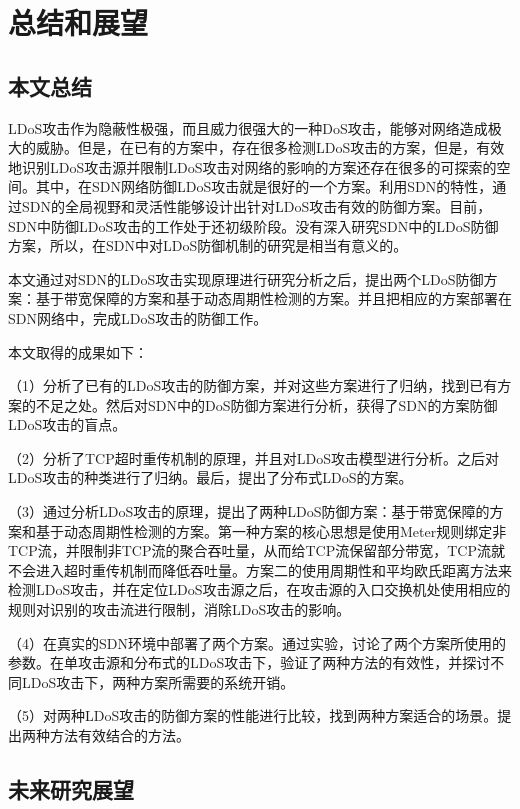 \chapter{总结和展望}
\label{cha:conclusion}

\section{本文总结}
\label{chap6:conclusion}

LDoS攻击作为隐蔽性极强，而且威力很强大的一种DoS攻击，能够对网络造成极大的威胁。但是，在已有的方案中，存在很多检测LDoS攻击的方案，但是，有效地识别LDoS攻击源并限制LDoS攻击对网络的影响的方案还存在很多的可探索的空间。其中，在SDN网络防御LDoS攻击就是很好的一个方案。利用SDN的特性，通过SDN的全局视野和灵活性能够设计出针对LDoS攻击有效的防御方案。目前，SDN中防御LDoS攻击的工作处于还初级阶段。没有深入研究SDN中的LDoS防御方案，所以，在SDN中对LDoS防御机制的研究是相当有意义的。

本文通过对SDN的LDoS攻击实现原理进行研究分析之后，提出两个LDoS防御方案：基于带宽保障的方案和基于动态周期性检测的方案。并且把相应的方案部署在SDN网络中，完成LDoS攻击的防御工作。

\noindent 本文取得的成果如下：

（1）分析了已有的LDoS攻击的防御方案，并对这些方案进行了归纳，找到已有方案的不足之处。然后对SDN中的DoS防御方案进行分析，获得了SDN的方案防御LDoS攻击的盲点。

（2）分析了TCP超时重传机制的原理，并且对LDoS攻击模型进行分析。之后对LDoS攻击的种类进行了归纳。最后，提出了分布式LDoS的方案。

（3）通过分析LDoS攻击的原理，提出了两种LDoS防御方案：基于带宽保障的方案和基于动态周期性检测的方案。第一种方案的核心思想是使用Meter规则绑定非TCP流，并限制非TCP流的聚合吞吐量，从而给TCP流保留部分带宽，TCP流就不会进入超时重传机制而降低吞吐量。方案二的使用周期性和平均欧氏距离方法来检测LDoS攻击，并在定位LDoS攻击源之后，在攻击源的入口交换机处使用相应的规则对识别的攻击流进行限制，消除LDoS攻击的影响。

（4）在真实的SDN环境中部署了两个方案。通过实验，讨论了两个方案所使用的参数。在单攻击源和分布式的LDoS攻击下，验证了两种方法的有效性，并探讨不同LDoS攻击下，两种方案所需要的系统开销。

（5）对两种LDoS攻击的防御方案的性能进行比较，找到两种方案适合的场景。提出两种方法有效结合的方法。


\section{未来研究展望}
\label{chap6:expection}

